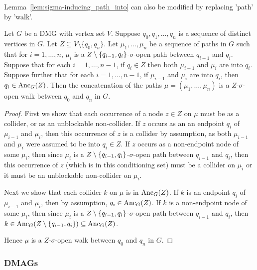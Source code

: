 Lemma~\ref{lem:sigma-inducing_path_into} can also be modified by replacing 'path' by 'walk'.

\begin{Lem}\label{lem:dpag_concatenated_collider_walk}
  Let $G$ be a DMG with vertex set $V$. 
  Suppose $q_0, q_1, \dots, q_n$ is a sequence of distinct vertices in $G$.
  Let $Z \subseteq V \setminus \{q_0,q_n\}$.
  Let $\mu_1,\dots,\mu_n$ be a sequence of paths in $G$ such that for $i=1,\dots,n$,
  $\mu_i$ is a $Z\setminus\{q_{i-1},q_i\}$-$\sigma$-open path between $q_{i-1}$ and $q_i$.
  Suppose that for each $i=1,\dots,n-1$, if $q_i \in Z$ then both $\mu_{i-1}$ and $\mu_i$ are into $q_i$.
  Suppose further that for each $i=1,\dots,n-1$, if $\mu_{i-1}$ and $\mu_i$ are into $q_i$, then $q_i \in \mathrm{Anc}_G(Z)$.
  Then the concatenation of the paths $\mu = (\mu_1,\dots,\mu_n)$ is a $Z$-$\sigma$-open walk between $q_0$ and $q_n$ in $G$.
\end{Lem}
\begin{proof}
  First we show that each occurrence of a node $z \in Z$ on $\mu$ must be as a collider, or as an unblockable non-collider.
  If $z$ occurs as an an endpoint $q_i$ of $\mu_{i-1}$ and $\mu_i$, then this occurrence of $z$ is a collider by assumption, as both $\mu_{i-1}$ and $\mu_i$ were assumed to be into $q_i \in Z$.
  If $z$ occurs as a non-endpoint node of some $\mu_i$, then since $\mu_i$ is a $Z\setminus\{q_{i-1},q_i\}$-$\sigma$-open path between $q_{i-1}$ and $q_i$, then this occurrence of $z$ (which is in this conditioning set) must be a collider on $\mu_i$ or it must be an unblockable non-collider on $\mu_i$.

  Next we show that each collider $k$ on $\mu$ is in $\mathrm{Anc}_G(Z)$.
  If $k$ is an endpoint $q_i$ of $\mu_{i-1}$ and $\mu_i$, then by assumption, $q_i \in \mathrm{Anc}_G(Z)$.
  If $k$ is a non-endpoint node of some $\mu_i$, then since $\mu_i$ is a $Z\setminus\{q_{i-1},q_i\}$-$\sigma$-open path between $q_{i-1}$ and $q_i$, then $k \in \mathrm{Anc}_G(Z\setminus\{q_{i-1},q_{i}\}) \subseteq \mathrm{Anc}_G(Z)$.

  Hence $\mu$ is a $Z$-$\sigma$-open walk between $q_0$ and $q_n$ in $G$.
\end{proof}

\subsubsection{DMAGs}

